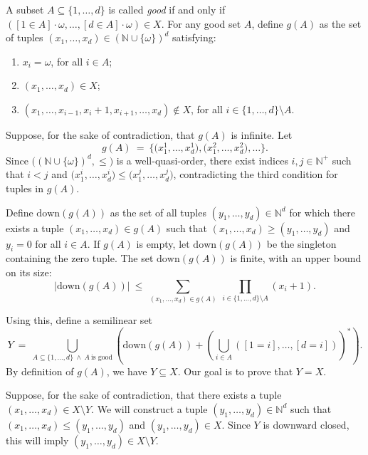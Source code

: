 \documentclass[12pt]{article}
\begin{document}
	\medskip
	
	A subset \(A \subseteq \{1, \ldots, d\}\) is called \textit{good} if and
	only if \(([1 \in A] \cdot \omega, \ldots, [d \in A] \cdot \omega) \in X\).
	For any good set \(A\), define \(g(A)\) as the set of tuples \((x_{1},
	\ldots, x_{d}) \in (\mathbb{N} \cup \{\omega\})^{d}\) satisfying:
	\begin{enumerate}
		\item \(x_{i} = \omega\), for all \(i \in A\);
		\item \((x_{1}, \ldots, x_{d}) \in X\);
		\item \((x_{1}, \ldots, x_{i - 1}, x_{i} + 1, x_{i + 1}, \ldots, x_{d})
		      \notin X\), for all \(i \in \{1, \ldots, d\} \setminus A\).
	\end{enumerate}
	
	Suppose, for the sake of contradiction, that \(g(A)\) is infinite. Let
	\[ g(A) \ = \ \big\{ \big( x_{1}^{1}, \ldots, x_{d}^{1} \big), \big(
	x_{1}^{2}, \ldots, x_{d}^{2} \big), \ldots \big\} \text{.} \]
	Since \(\big( (\mathbb{N} \cup \{\omega\})^{d}, \leqslant \! \big)\) is a
	well-quasi-order, there exist indices \(i, j \in \mathbb{N}^{+}\) such that
	\(i < j\) and \(\big( x_{1}^{i}, \ldots, x_{d}^{i} \big) \leqslant \big(
	x_{1}^{j}, \ldots, x_{d}^{j} \big)\), contradicting the third condition for
	tuples in \(g(A)\).
	
	\medskip
	
	Define \(\text{down}(g(A))\) as the set of all tuples \((y_{1}, \ldots,
	y_{d}) \in \mathbb{N}^{d}\) for which there exists a tuple \((x_{1}, \ldots,
	x_{d}) \in g(A)\) such that \((x_{1}, \ldots, x_{d}) \geqslant (y_{1},
	\ldots, y_{d})\) and \(y_{i} = 0\) for all \(i \in A\). If \(g(A)\) is
	empty, let \(\text{down}(g(A))\) be the singleton containing the zero tuple.
	The set \(\text{down}(g(A))\) is finite, with an upper bound on its size:
	\[ |\text{down}(g(A))| \ \leqslant \ \sum\limits_{(x_{1}, \ldots, x_{d}) \in
	g(A)} \ \prod\limits_{i \in \{1, \ldots, d\} \setminus A} (x_{i} + 1)
	\text{.} \]
	
	Using this, define a semilinear set
	\[ Y \ = \ \bigcup_{A \subseteq \{1, \ldots, d\} \ \wedge \ A \
	\text{is good}} \left( \text{down}(g(A)) + \left( \bigcup_{i \in A}
	([1 = i], \ldots, [d = i]) \right)^{\ast} \right) \text{.} \]
	By definition of \(g(A)\), we have \(Y \subseteq X\). Our goal is to prove
	that \(Y = X\).
	
	\medskip
	
	Suppose, for the sake of contradiction, that there exists a tuple \((x_{1},
	\ldots, x_{d}) \in X \setminus Y\). We will construct a tuple \((y_{1},
	\ldots, y_{d}) \in \mathbb{N}^{d}\) such that \((x_{1}, \ldots, x_{d})
	\leqslant (y_{1}, \ldots, y_{d})\) and \((y_{1}, \ldots, y_{d}) \in X\).
	Since \(Y\) is downward closed, this will imply \((y_{1}, \ldots, y_{d}) \in
	X \setminus Y\).
	
\end{document}
